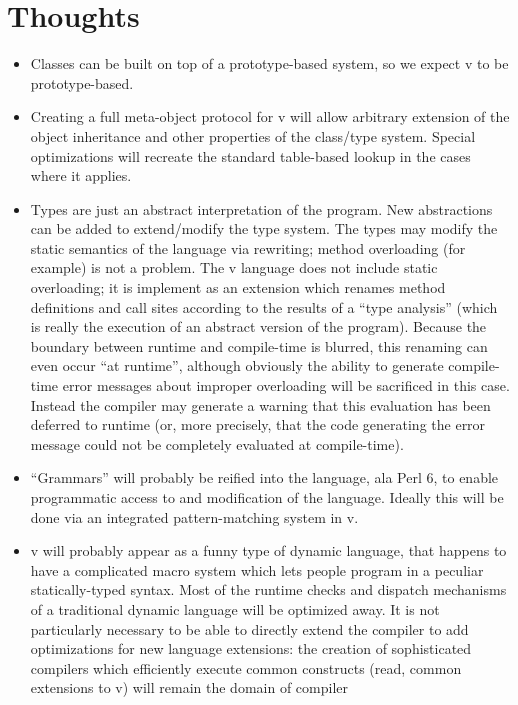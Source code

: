 \documentclass[11pt,notitlepage,twocolumn]{article}
\newcommand{\vlang}{\textsf{v}\xspace}
\begin{document}
\section{Thoughts}
\begin{itemize}
\item Classes can be built on top of a prototype-based system, so we
  expect \vlang to be prototype-based.
\item Creating a full meta-object protocol for \vlang will allow arbitrary
  extension of the object inheritance and other properties of the
  class/type system.  Special optimizations will recreate the standard
  table-based lookup in the cases where it applies.
\item Types are just an abstract interpretation of the program.  New
  abstractions can be added to extend/modify the type system.  The
  types may modify the static semantics of the language via rewriting;
  method overloading (for example) is not a problem.  The \vlang language
  does not include static overloading; it is implement as an extension which
  renames method definitions and call sites according to the results
  of a ``type analysis'' (which is really the execution of an abstract
  version of the program).  Because the boundary between runtime and
  compile-time is blurred, this renaming can even occur ``at
  runtime'', although obviously the ability to generate compile-time
  error messages about improper overloading will be sacrificed in this
  case.  Instead the compiler may generate a warning that this
  evaluation has been deferred to runtime (or, more precisely, that
  the code generating the error message could not be completely
  evaluated at compile-time).
\item ``Grammars'' will probably be reified into the language, ala
  Perl 6, to enable programmatic access to and modification of the
  language.  Ideally this will be done via an integrated
  pattern-matching system in \vlang.
\item \vlang will probably appear as a funny type of dynamic language,
  that happens to have a complicated macro system which lets people
  program in a peculiar statically-typed syntax.  Most of the
  runtime checks and dispatch mechanisms of a traditional dynamic
  language will be optimized away.  It is not particularly
  necessary to be able to directly extend the compiler to add
  optimizations for new language extensions: the creation of
  sophisticated compilers which efficiently execute common constructs
  (read, common extensions to \vlang) will remain the domain of compiler

\end{itemize}
\end{document}
